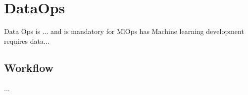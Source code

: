 \section{DataOps}\label{sec:dataops}
Data Ops is ... and is mandatory for MlOps has Machine learning development requires data...

\subsection{Workflow}

...

